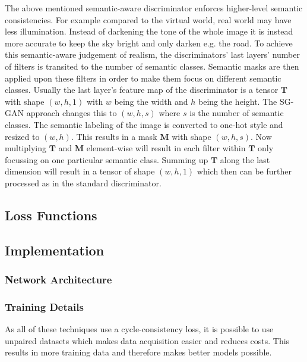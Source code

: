 The above mentioned semantic-aware discriminator enforces higher-level semantic consistencies. For example compared to the virtual world, real world may have less illumination. Instead of darkening the tone of the whole image it is instead more accurate to keep the sky bright and only darken e.g. the road. To achieve this semantic-aware judgement of realism, the discriminators' last layers' number of filters is transited to the number of semantic classes. Semantic masks are then applied upon these filters in order to make them focus on different semantic classes. Usually the last layer's feature map of the discriminator is a tensor $\mathbf{T}$ with shape $(w,h,1)$ with $w$ being the width and $h$ being the height. The SG-GAN approach changes this to $(w,h,s)$ where $s$ is the number of semantic classes. The semantic labeling of the image is converted to one-hot style and resized to $(w,h)$. This results in a mask $\mathbf{M}$ with shape $(w,h,s)$. Now multiplying $\mathbf{T}$ and $\mathbf{M}$ element-wise will result in each filter within $\mathbf{T}$ only focussing on one particular semantic class. Summing up $\mathbf{T}$ along the last dimension will result in a tensor of shape $(w,h,1)$ which then can be further processed as in the standard discriminator. 

\subsection{Loss Functions}
\subsection{Implementation}
\subsubsection{Network Architecture}
\subsubsection{Training Details}


As all of these techniques use a cycle-consistency loss, it is possible to use unpaired datasets which makes data acquisition easier and reduces costs. This results in more training data and therefore makes better models possible. 












